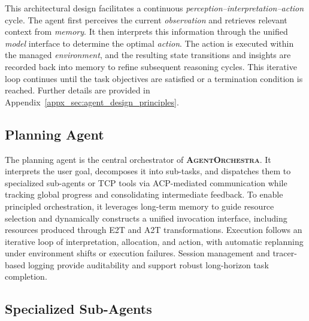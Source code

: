 \documentclass[11pt]{article}
\newcommand{\projectname}{\textbf{\textsc{AgentOrchestra}}\xspace}
\begin{document}
This architectural design facilitates a continuous \textit{perception--interpretation--action} cycle. The agent first perceives the current \textit{observation} and retrieves relevant context from \textit{memory}. It then interprets this information through the unified \textit{model} interface to determine the optimal \textit{action}. The action is executed within the managed \textit{environment}, and the resulting state transitions and insights are recorded back into memory to refine subsequent reasoning cycles. This iterative loop continues until the task objectives are satisfied or a termination condition is reached. Further details are provided in Appendix~\ref{appx_sec:agent_design_principles}.

\subsection{Planning Agent}
\label{sec:planning_agent}

The planning agent is the central orchestrator of \projectname. It interprets the user goal, decomposes it into sub-tasks, and dispatches them to specialized sub-agents or TCP tools via ACP-mediated communication while tracking global progress and consolidating intermediate feedback. To enable principled orchestration, it leverages long-term memory to guide resource selection and dynamically constructs a unified invocation interface, including resources produced through E2T and A2T transformations. Execution follows an iterative loop of interpretation, allocation, and action, with automatic replanning under environment shifts or execution failures. Session management and tracer-based logging provide auditability and support robust long-horizon task completion.

\subsection{Specialized Sub-Agents}
\label{sec:sub_agents}
\end{document}

